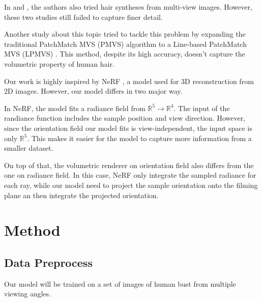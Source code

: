 \documentclass[12pt]{article}
\begin{document}
In \cite{sklyarova_neural_2023} and \cite{rosu_neural_2022}, the authors also tried hair syntheses from multi-view images. However, these two studies still failed to capture finer detail.

Another study about this topic tried to tackle this problem by expanding the traditional PatchMatch MVS (PMVS) algorithm to a Line-based PatchMatch MVS (LPMVS) \cite{nam_strand-accurate_nodate}. This method, despite its high accuracy, doesn't capture the volumetric property of human hair.

Our work is highly inspired by NeRF \cite{mildenhall_nerf_2020}, a model used for 3D reconstruction from 2D images. However, our model differs in two major way.

In NeRF, the model fits a radiance field from $\mathbb{R}^{5} \rightarrow \mathbb{R}^{4}$. The input of the randiance function includes the sample position and view direction. However, since the orientation field our model fits is view-independent, the input space is only $\mathbb{R}^{5}$. This makes it easier for the model to capture more information from a smaller dataset.

On top of that, the volumetric renderer on orientation field also differs from the one on radiance field. In this case, NeRF only integrate the sampled radiance for each ray, while our model need to project the sample orientation onto the filming plane an then integrate the projected orientation.

\section{Method}
\subsection{Data Preprocess}

Our model will be trained on a set of images of human bust from multiple viewing angles.
\end{document}
